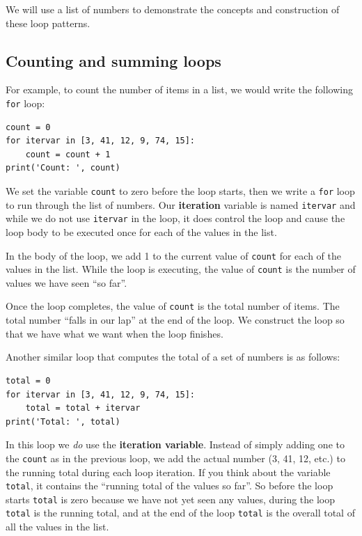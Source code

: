 We will use a list of numbers to demonstrate the concepts and construction
of these loop patterns.  

\subsection{Counting and summing loops}

For example, to count the number of items
in a list, we would write the following {\tt for} loop:

\beforeverb
\begin{verbatim}
count = 0
for itervar in [3, 41, 12, 9, 74, 15]:
    count = count + 1
print('Count: ', count)
\end{verbatim}
\afterverb
%
We set the variable {\tt count} to zero before the loop starts,
then we write a {\tt for} loop to run through the list of numbers.
Our {\bf iteration} variable is named {\tt itervar} and while we do
not use {\tt itervar} in the loop, it does control the loop and cause
the loop body to be executed once for each of the values in the list.

In the body of the loop, we add 1 to the current value of {\tt count}
for each of the values in the list.  While the loop is executing, the 
value of {\tt count} is the number of values we have seen ``so far''.

Once the loop completes, the value of {\tt count} is the total number
of items.   The total number ``falls in our lap'' at the end of the 
loop.  We construct the loop so that we have what we want when the loop
finishes.

Another similar loop that computes the total of a set of numbers
is as follows:

\beforeverb
\begin{verbatim}
total = 0
for itervar in [3, 41, 12, 9, 74, 15]:
    total = total + itervar
print('Total: ', total)
\end{verbatim}
\afterverb
%
In this loop we \emph{do} use the {\bf iteration variable}.
Instead of simply adding one to the {\tt count} as in the previous loop, 
we add the actual number (3, 41, 12, etc.) to the running 
total during each loop iteration.
If you think about the variable {\tt total}, it contains the 
``running total of the values so far''.  So before the loop
starts {\tt total} is zero because we have not yet seen any values,
during the loop {\tt total} is the running total, and at the end of 
the loop {\tt total} is the overall total of all the values 
in the list.


